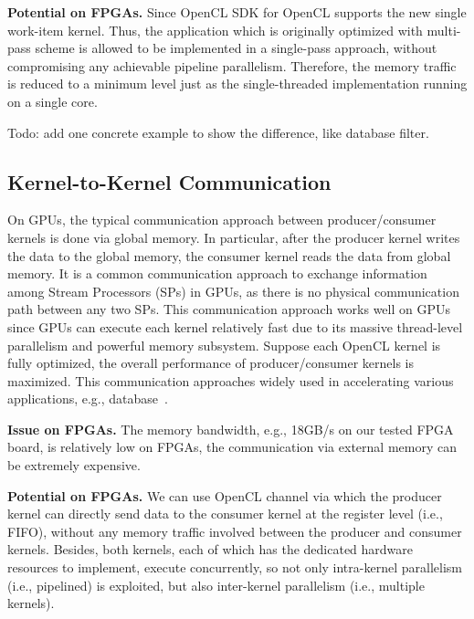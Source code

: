 {\bf Potential on FPGAs. } Since OpenCL SDK for OpenCL supports the new single work-item kernel. Thus, the application which is originally optimized with multi-pass scheme is allowed to be implemented in a single-pass approach, without compromising any achievable pipeline parallelism. Therefore, the memory traffic is reduced to a minimum level just as the single-threaded implementation running on a single core. 

Todo: add one concrete example to show the difference, like database filter.

\subsection{Kernel-to-Kernel Communication}
On GPUs, the typical communication approach between producer/consumer kernels is done via global memory. In particular, after the producer kernel writes the data to the global memory, the consumer kernel reads the data from global memory. It is a common communication approach to exchange information among Stream Processors (SPs) in GPUs, as there is no physical communication path between any two SPs. This communication approach works well on GPUs since GPUs can execute each kernel relatively fast due to its massive thread-level parallelism and powerful memory subsystem. Suppose each OpenCL kernel is fully optimized, the overall performance of producer/consumer kernels is maximized. %
This communication approaches widely used in accelerating various applications, e.g., database~\cite{query_gpu_tods09, omnidb_vldb13}. 

{\bf Issue on FPGAs. }The memory bandwidth, e.g., 18GB/s on our tested FPGA board, is relatively low on FPGAs, the communication via external memory can be extremely expensive. 

{\bf Potential on FPGAs. }We can use OpenCL channel via which the producer kernel can directly send data to the consumer kernel at the register level (i.e., FIFO), without any memory traffic involved between the producer and consumer kernels. Besides, both kernels, each of which has the dedicated hardware resources to implement, execute concurrently, so not only intra-kernel parallelism (i.e., pipelined) is exploited, but also inter-kernel parallelism (i.e., multiple kernels).  





